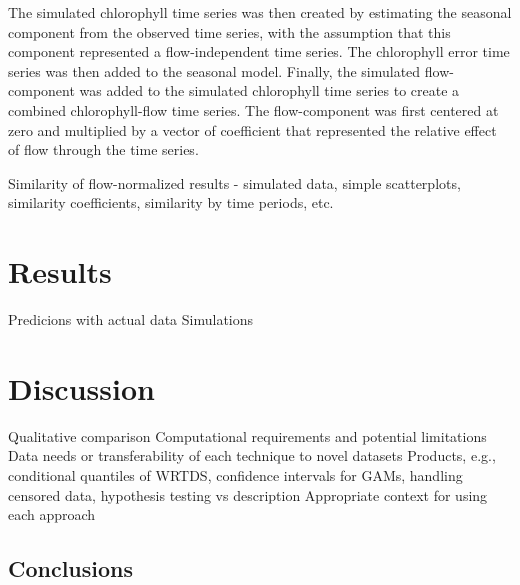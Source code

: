 \documentclass[letterpaper,12pt,oneside]{article}\usepackage[]{graphicx}\usepackage[]{color}
\begin{document}
The simulated chlorophyll time series was then created by estimating the seasonal component from the observed time series, with the assumption that this component represented a flow-independent time series.  The chlorophyll error time series was then added to the seasonal model.  Finally, the simulated flow-component was added to the simulated chlorophyll time series to create a combined chlorophyll-flow time series.  The flow-component was first centered at zero and multiplied by a vector of coefficient that represented the relative effect of flow through the time series.  

Similarity of flow-normalized results - simulated data, simple scatterplots, similarity coefficients, similarity by time periods, etc.

\section{Results}

\begin{outline}
\0 Predicions with actual data
\0 Simulations
\end{outline}

\section{Discussion}

\begin{outline}
\0 Qualitative comparison
\1 Computational requirements and potential limitations
\1 Data needs or transferability of each technique to novel datasets
\1 Products, e.g., conditional quantiles of \ac{WRTDS}, confidence intervals for \acp{GAM}, handling censored data, hypothesis testing vs description
\1 Appropriate context for using each approach
\end{outline}

\subsection{Conclusions}

\clearpage
\begin{singlespace}


\end{singlespace}
\clearpage


\end{document}
